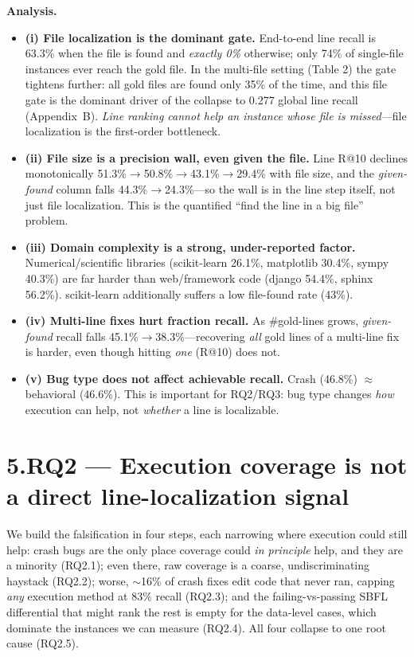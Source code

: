 \documentclass[11pt]{article}
\begin{document}
\noindent\textbf{Analysis.}
\begin{itemize}
  \item \textbf{(i) File localization is the dominant gate.} End-to-end line recall is 63.3\% when the file is found and \emph{exactly 0\%} otherwise; only 74\% of single-file instances ever reach the gold file. In the multi-file setting (Table 2) the gate tightens further: all gold files are found only 35\% of the time, and this file gate is the dominant driver of the collapse to 0.277 global line recall (Appendix~B). \emph{Line ranking cannot help an instance whose file is missed}---file localization is the first-order bottleneck.
  \item \textbf{(ii) File size is a precision wall, even given the file.} Line R@10 declines monotonically 51.3\%$\rightarrow$50.8\%$\rightarrow$43.1\%$\rightarrow$29.4\% with file size, and the \emph{given-found} column falls 44.3\%$\rightarrow$24.3\%---so the wall is in the line step itself, not just file localization. This is the quantified ``find the line in a big file'' problem.
  \item \textbf{(iii) Domain complexity is a strong, under-reported factor.} Numerical/scientific libraries (scikit-learn 26.1\%, matplotlib 30.4\%, sympy 40.3\%) are far harder than web/framework code (django 54.4\%, sphinx 56.2\%). scikit-learn additionally suffers a low file-found rate (43\%).
  \item \textbf{(iv) Multi-line fixes hurt fraction recall.} As \#gold-lines grows, \emph{given-found} recall falls 45.1\%$\rightarrow$38.3\%---recovering \emph{all} gold lines of a multi-line fix is harder, even though hitting \emph{one} (R@10) does not.
  \item \textbf{(v) Bug type does not affect achievable recall.} Crash (46.8\%) $\approx$ behavioral (46.6\%). This is important for RQ2/RQ3: bug type changes \emph{how} execution can help, not \emph{whether} a line is localizable.
\end{itemize}

\section*{5.\quad RQ2 --- Execution coverage is not a direct line-localization signal}

We build the falsification in four steps, each narrowing where execution could still help: crash bugs are the only place coverage could \emph{in principle} help, and they are a minority (RQ2.1); even there, raw coverage is a coarse, undiscriminating haystack (RQ2.2); worse, $\sim$16\% of crash fixes edit code that never ran, capping \emph{any} execution method at 83\% recall (RQ2.3); and the failing-vs-passing SBFL differential that might rank the rest is empty for the data-level cases, which dominate the instances we can measure (RQ2.4). All four collapse to one root cause (RQ2.5).
\end{document}
